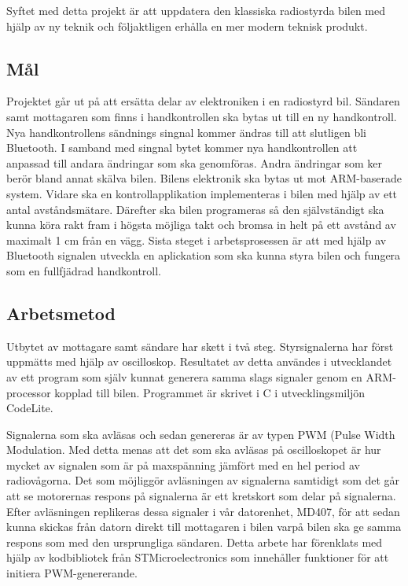 \documentclass[a4paper]{article}
\begin{document}
Syftet med detta projekt är att uppdatera den klassiska radiostyrda bilen med hjälp av ny teknik och följaktligen erhålla en mer modern teknisk produkt.

\subsection{Mål}

Projektet går ut på att ersätta delar av elektroniken i en radiostyrd bil. Sändaren samt mottagaren som finns i handkontrollen ska bytas ut till en ny handkontroll. Nya handkontrollens sändnings singnal kommer ändras till att slutligen bli  Bluetooth. I samband med singnal bytet kommer nya handkontrollen att anpassad till andara ändringar som ska genomföras. Andra ändringar som ker berör bland annat skälva bilen. Bilens elektronik ska bytas ut mot ARM-baserade system. Vidare ska en kontrollapplikation implementeras i bilen med hjälp av ett antal avståndsmätare. Därefter ska bilen programeras så den självständigt ska kunna köra rakt fram i högsta möjliga takt och bromsa in helt på ett avstånd av maximalt 1 cm från en vägg. Sista steget i arbetsprosessen är att med hjälp av Bluetooth signalen utveckla en aplickation som ska kunna styra bilen och fungera som en fullfjädrad handkontroll.


\subsection{Arbetsmetod}

Utbytet av mottagare samt sändare har skett i två steg. Styrsignalerna har först uppmätts med hjälp av oscilloskop. Resultatet av detta användes i utvecklandet av ett program som själv kunnat generera samma slags signaler genom en ARM-processor kopplad till bilen. Programmet är skrivet i C i utvecklingsmiljön CodeLite.

\vspace{5mm} \noindent
Signalerna som ska avläsas och sedan genereras är av typen PWM (Pulse Width Modulation. Med detta menas att det som ska avläsas på oscilloskopet är hur mycket av signalen som är på maxspänning jämfört med en hel period av radiovågorna. Det som möjliggör avläsningen av signalerna samtidigt som det går att se motorernas respons på signalerna är ett kretskort som delar på signalerna. Efter avläsningen replikeras dessa signaler i vår datorenhet, MD407, för att sedan kunna skickas från datorn direkt till mottagaren i bilen varpå bilen ska ge samma respons som med den ursprungliga sändaren. Detta arbete har förenklats med hjälp av kodbibliotek från STMicroelectronics som innehåller funktioner för att initiera PWM-genererande. 
\end{document}
